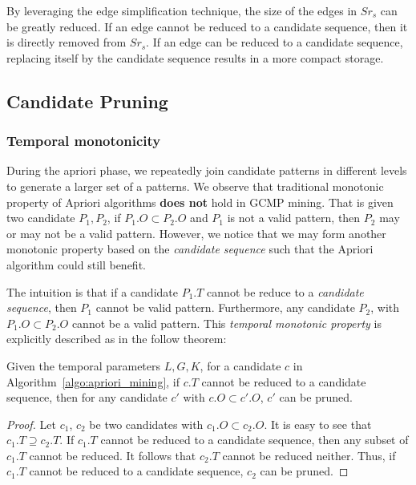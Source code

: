 By leveraging the edge simplification technique, 
the size of the edges in $Sr_s$ can be greatly reduced. If
an edge cannot be reduced to a candidate sequence, then it is directly removed from $Sr_s$.
If an edge can be reduced to a candidate sequence, replacing itself 
by the candidate sequence results in a more compact storage.

%


\subsection{Candidate Pruning}
\subsubsection{Temporal monotonicity}
During the apriori phase, we repeatedly join candidate patterns in different levels to generate a larger set
of a patterns. We observe that traditional monotonic property of Apriori algorithms \textbf{does not}
hold in GCMP mining. That is given two candidate $P_1, P_2$, if $P_1.O \subset P_2.O$ and $P_1$ is not 
a valid pattern, then $P_2$ may or may not be a valid pattern. However, we notice that
we may form another monotonic property based on the \emph{candidate sequence} such that
the Apriori algorithm could still benefit.

The intuition is that if a candidate $P_1.T$ cannot be reduce to a \emph{candidate sequence}, then $P_1$ cannot 
be valid pattern. Furthermore, any candidate $P_2$, with $P_1.O \subset P_2.O$ cannot be a valid pattern.
This \emph{temporal monotonic property} 
is explicitly described as in the follow theorem:

\begin{theorem}
Given the temporal parameters $L,G,K$, for a candidate $c$ in Algorithm~\ref{algo:apriori_mining},
if $c.T$ cannot be reduced to a candidate sequence, then for any candidate $c'$ with $c.O \subset c'.O$, $c'$ can be pruned.
\end{theorem}
\begin{proof}
Let $c_1$, $c_2$ be two candidates with $c_1.O \subset c_2.O$. It is easy to see that $c_1.T \supseteq c_2.T$.
If $c_1.T$ cannot be reduced to a candidate sequence, then any subset of $c_1.T$ cannot
be reduced. It follows that $c_2.T$ cannot be reduced neither. Thus,
if $c_1.T$ cannot be reduced to a candidate sequence, $c_2$ can be pruned. 
\end{proof}

